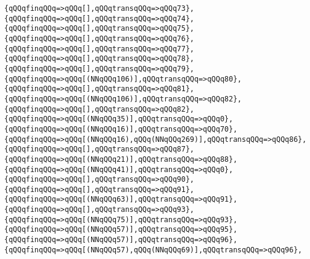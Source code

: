 \verb|{qQQqfinqQQq=>qQQq[],qQQqtransqQQq=>qQQq73},|\newline
\verb|{qQQqfinqQQq=>qQQq[],qQQqtransqQQq=>qQQq74},|\newline
\verb|{qQQqfinqQQq=>qQQq[],qQQqtransqQQq=>qQQq75},|\newline
\verb|{qQQqfinqQQq=>qQQq[],qQQqtransqQQq=>qQQq76},|\newline
\verb|{qQQqfinqQQq=>qQQq[],qQQqtransqQQq=>qQQq77},|\newline
\verb|{qQQqfinqQQq=>qQQq[],qQQqtransqQQq=>qQQq78},|\newline
\verb|{qQQqfinqQQq=>qQQq[],qQQqtransqQQq=>qQQq79},|\newline
\verb|{qQQqfinqQQq=>qQQq[(NNqQQq106)],qQQqtransqQQq=>qQQq80},|\newline
\verb|{qQQqfinqQQq=>qQQq[],qQQqtransqQQq=>qQQq81},|\newline
\verb|{qQQqfinqQQq=>qQQq[(NNqQQq106)],qQQqtransqQQq=>qQQq82},|\newline
\verb|{qQQqfinqQQq=>qQQq[],qQQqtransqQQq=>qQQq82},|\newline
\verb|{qQQqfinqQQq=>qQQq[(NNqQQq35)],qQQqtransqQQq=>qQQq0},|\newline
\verb|{qQQqfinqQQq=>qQQq[(NNqQQq16)],qQQqtransqQQq=>qQQq70},|\newline
\verb|{qQQqfinqQQq=>qQQq[(NNqQQq16),qQQq(NNqQQq269)],qQQqtransqQQq=>qQQq86},|\newline
\verb|{qQQqfinqQQq=>qQQq[],qQQqtransqQQq=>qQQq87},|\newline
\verb|{qQQqfinqQQq=>qQQq[(NNqQQq21)],qQQqtransqQQq=>qQQq88},|\newline
\verb|{qQQqfinqQQq=>qQQq[(NNqQQq41)],qQQqtransqQQq=>qQQq0},|\newline
\verb|{qQQqfinqQQq=>qQQq[],qQQqtransqQQq=>qQQq90},|\newline
\verb|{qQQqfinqQQq=>qQQq[],qQQqtransqQQq=>qQQq91},|\newline
\verb|{qQQqfinqQQq=>qQQq[(NNqQQq63)],qQQqtransqQQq=>qQQq91},|\newline
\verb|{qQQqfinqQQq=>qQQq[],qQQqtransqQQq=>qQQq93},|\newline
\verb|{qQQqfinqQQq=>qQQq[(NNqQQq75)],qQQqtransqQQq=>qQQq93},|\newline
\verb|{qQQqfinqQQq=>qQQq[(NNqQQq57)],qQQqtransqQQq=>qQQq95},|\newline
\verb|{qQQqfinqQQq=>qQQq[(NNqQQq57)],qQQqtransqQQq=>qQQq96},|\newline
\verb|{qQQqfinqQQq=>qQQq[(NNqQQq57),qQQq(NNqQQq69)],qQQqtransqQQq=>qQQq96},|\newline
